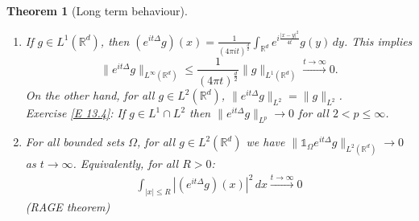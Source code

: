 \documentclass{report}
\theoremstyle{tommy}
\newtheorem{thm}[defn]{Theorem}
\begin{document}
  \begin{thm}[Long term behaviour]\
    \begin{enumerate}
      \item If \(g \in L^1(\mathbb{R}^d)\), then \((e^{it \Delta}g)(x) = \frac{1}{(4 \pi it)^{\frac{d}{2}}} \int_{\mathbb{R}^d} e^{i \frac{|x-y|^2}{4 t}} g(y) \, dy\). This implies 
      \[\|e^{it \Delta} g\|_{L^\infty(\mathbb{R}^d)} \le \frac{1}{(4 \pi t)^{\frac{d}{2}}} \|g\|_{L^1(\mathbb{R}^d)}\xrightarrow{t \to \infty} 0.\] On the other hand, for all \(g \in L^2(\mathbb{R}^d)\), \(\|e^{it \Delta} g\|_{L^2} = \|g\|_{L^2}\). \\
      Exercise \ref{E 13.4}: If \(g \in L^1 \cap L^2\) then \(\|e^{it \Delta} g\|_{L^p} \to 0\) for all \( 2 < p \le \infty\).
      \item For all bounded sets \(\Omega\), for all \(g \in L^2(\mathbb{R}^d)\) we have \(\|\mathbb{1}_\Omega e^{it \Delta} g\|_{L^2(\mathbb{R}^d)} \to 0\) as \(t \to \infty\). Equivalently, for all \(R > 0\):
      \begin{align*}
        \int_{|x| \le R} |(e^{it \Delta}g)(x)|^2 \, dx \xrightarrow{t \to \infty} 0
      \end{align*}
      (RAGE theorem)
    \end{enumerate}
  \end{thm}
\end{document}
